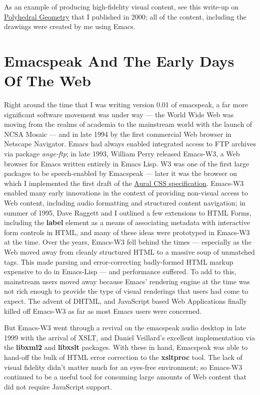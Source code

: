 \documentclass[11pt]{article}
\begin{document}
As an example of producing high-fidelity visual content, see this
write-up on
\href{http://emacspeak.sourceforge.net/raman/publications/polyhedra/}{Polyhedral
Geometry} that I published in 2000; all of the content,
including the drawings were created by me using Emacs.

\section{Emacspeak And The Early Days Of The Web}
\label{sec-7}

Right around the time that I was writing version 0.01 of
emacspeak, a far more significant software movement was under way
— the World Wide Web was moving from the realms of academia to
the mainstream world with the launch of NCSA Mosaic — and in late
1994 by the first commercial Web browser in Netscape
Navigator. Emacs had always enabled integrated access to FTP
archives via package \emph{ange-ftp}; in late 1993, William Perry
released Emacs-W3, a Web browser for Emacs written entirely in
Emacs Lisp. W3 was one of the first large packages to be
speech-enabled by Emacspeak — later it was the browser on which I
implemented the first draft of the
\href{http://www.w3.org/TR/CSS2/aural.html}{Aural CSS
specification}. Emacs-W3 enabled many early innovations in the
context of providing non-visual access to Web content, including
audio formatting and structured content navigation; in summer of
1995, Dave Raggett and I outlined a few extensions to HTML Forms,
including the \textbf{label} element as a means of associating metadata
with interactive form controls in HTML, and many of these ideas
were prototyped in Emacs-W3 at the time. Over the years, Emacs-W3
fell behind the times — especially as the Web moved away from
cleanly structured HTML to a massive soup of unmatched tags. This
made parsing and error-correcting badly-formed HTML markup
expensive to do in Emacs-Lisp — and performance suffered. To add
to this, mainstream users moved away because Emacs' rendering
engine at the time was not rich enough to provide the type of
visual renderings that users had come to expect. The advent of
DHTML, and JavaScript based Web Applications finally killed off
Emacs-W3 as far as most Emacs users were concerned.

But Emacs-W3 went through a revival on the emacspeak audio
desktop in late 1999 with the arrival of XSLT, and Daniel
Veillard's excellent implementation via the \textbf{libxml2} and
\textbf{libxslt} packages. With these in hand, Emacspeak was able to
hand-off the bulk of HTML error correction to the \textbf{xsltproc}
tool. The lack of visual fidelity didn't matter much for an
eyes-free environment; so Emacs-W3 continued to be a useful tool
for consuming large amounts of Web content that did not require
JavaScript support.
\end{document}
